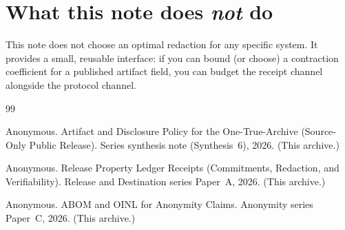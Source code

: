 \documentclass[11pt]{article}
\begin{document}
\section{What this note does \emph{not} do}
This note does not choose an optimal redaction for any specific system.
It provides a small, reusable interface: if you can bound (or choose) a contraction coefficient for a published artifact field, you can budget the receipt channel alongside the protocol channel.

\begin{thebibliography}{99}\small

Anonymous.
\newblock Artifact and Disclosure Policy for the One-True-Archive (Source-Only Public Release).
\newblock Series synthesis note (Synthesis~6), 2026. (This archive.)

Anonymous.
\newblock Release Property Ledger Receipts (Commitments, Redaction, and Verifiability).
\newblock Release and Destination series Paper~A, 2026. (This archive.)

Anonymous.
\newblock ABOM and OINL for Anonymity Claims.
\newblock Anonymity series Paper~C, 2026. (This archive.)

\end{thebibliography}
\end{document}
